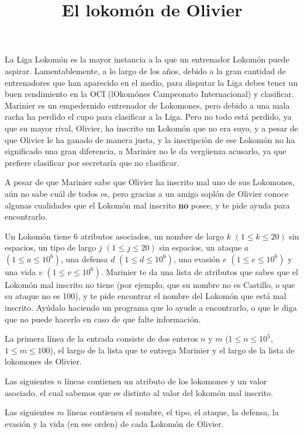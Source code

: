 \documentclass{oci}
\title{El lokomón de Olivier}
\begin{document}
\begin{problemDescription}
La Liga Lokomón es la mayor instancia a la que un entrenador Lokomón puede aspirar. Lamentablemente, a lo largo de los años, debido a la gran cantidad de entrenadores que han aparecido en el medio, para disputar la Liga debes tener un buen rendimiento en la OCI (lOkomónes Campeonato Internacional) y clasificar. Marinier es un empedernido entrenador de Lokomones, pero debido a una mala racha ha perdido el cupo para clasificar a la Liga. Pero no todo está perdido, ya que su mayor rival, Olivier, ha inscrito un Lokomón que no era suyo, y a pesar de que Olivier le ha ganado de manera justa, y la inscripción de ese Lokomón no ha significado una gran diferencia, a Marinier no le da vergüenza acusarlo, ya que prefiere clasificar por secretaría que no clasificar. 
 
	A pesar de que Marinier sabe que Olivier ha inscrito mal uno de sus Lokomones, aún no sabe cuál de todos es, pero gracias a un amigo soplón de Olivier conoce algunas cualidades que el Lokomón mal inscrito \textbf{no} posee, y te pide ayuda para encontrarlo. 
 
Un Lokomón tiene 6 atributos asociados, un nombre de largo $k$ $(1 \leq k \leq 20)$ sin espacios, un tipo de largo $j$ $(1 \leq j \leq 20)$ sin espacios, un ataque $a$ $(1 \leq a \leq 10^{6})$, una defensa $d$ $(1 \leq d \leq 10^{6})$, una evasión $e$ $(1 \leq e \leq 10^{6})$ y una vida $v$ $(1 \leq v \leq 10^{6})$. Marinier te da una lista de atributos que sabes que el Lokomón mal inscrito no tiene (por ejemplo, que su nombre no es Castillo, o que su ataque no es 100), y te pide encontrar el nombre del Lokomón que está mal inscrito. Ayúdalo haciendo un programa que lo ayude a encontrarlo, o que le diga que no puede hacerlo en caso de que falte información. 

\end{problemDescription}

\begin{inputDescription}
	La primera línea de la entrada consiste de dos enteros $n$ y $m$ ($1 \leq n \leq 10^5$, $1 \leq m \leq 100$), el largo de la lista que te entrega Marinier y el largo de la lista de lokomones de Olivier.

Las siguientes $n$ líneas contienen un atributo de los lokomones y un valor asociado, el cual sabemos que es distinto al valor del lokomón mal inscrito.

Las siguientes $m$ líneas contienen el nombre, el tipo, el ataque, la defensa, la evasión y la vida (en ese orden) de cada Lokomón de Olivier.
\end{inputDescription}
\end{document}
